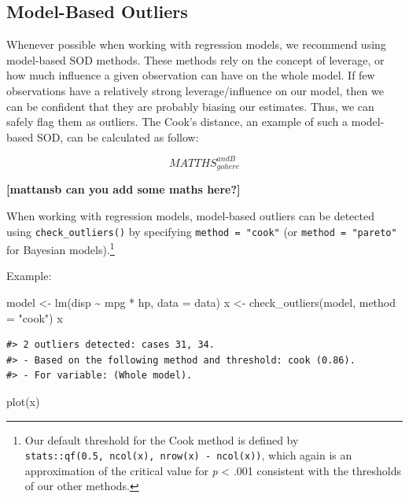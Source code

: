 \documentclass[
]{article}
\newenvironment{Shaded}{\begin{snugshade}}{\end{snugshade}}
\newcommand{\AttributeTok}[1]{\textcolor[rgb]{0.77,0.63,0.00}{#1}}
\newcommand{\FunctionTok}[1]{\textcolor[rgb]{0.00,0.00,0.00}{#1}}
\newcommand{\NormalTok}[1]{#1}
\newcommand{\OtherTok}[1]{\textcolor[rgb]{0.56,0.35,0.01}{#1}}
\newcommand{\SpecialCharTok}[1]{\textcolor[rgb]{0.00,0.00,0.00}{#1}}
\newcommand{\StringTok}[1]{\textcolor[rgb]{0.31,0.60,0.02}{#1}}
\begin{document}
\hypertarget{model-based-outliers}{%
\subsection{Model-Based Outliers}\label{model-based-outliers}}

Whenever possible when working with regression models, we recommend using model-based SOD methods. These methods rely on the concept of leverage, or how much influence a given observation can have on the whole model. If few observations have a relatively strong leverage/influence on our model, then we can be confident that they are probably biasing our estimates. Thus, we can safely flag them as outliers. The Cook's distance, an example of such a model-based SOD, can be calculated as follow:

\[
MATTHS_{gohere}^{andB}
\]

\textbf{{[}mattansb can you add some maths here?{]}}

When working with regression models, model-based outliers can be detected using \texttt{check\_outliers()} by specifying \texttt{method\ =\ "cook"} (or \texttt{method\ =\ "pareto"} for Bayesian models).\footnote{Our default threshold for the Cook method is defined by \texttt{stats::qf(0.5,\ ncol(x),\ nrow(x)\ -\ ncol(x))}, which again is an approximation of the critical value for \emph{p} \textless{} .001 consistent with the thresholds of our other methods.}

Example:



\begin{Shaded}
\begin{Highlighting}[]
\NormalTok{model }\OtherTok{\textless{}{-}} \FunctionTok{lm}\NormalTok{(disp }\SpecialCharTok{\textasciitilde{}}\NormalTok{ mpg }\SpecialCharTok{*}\NormalTok{ hp, }\AttributeTok{data =}\NormalTok{ data)}
\NormalTok{x }\OtherTok{\textless{}{-}} \FunctionTok{check\_outliers}\NormalTok{(model, }\AttributeTok{method =} \StringTok{"cook"}\NormalTok{)}
\NormalTok{x}
\end{Highlighting}
\end{Shaded}

\begin{verbatim}
#> 2 outliers detected: cases 31, 34.
#> - Based on the following method and threshold: cook (0.86).
#> - For variable: (Whole model).
\end{verbatim}

\begin{Shaded}
\begin{Highlighting}[]
\FunctionTok{plot}\NormalTok{(x)}
\end{Highlighting}
\end{Shaded}
\end{document}
